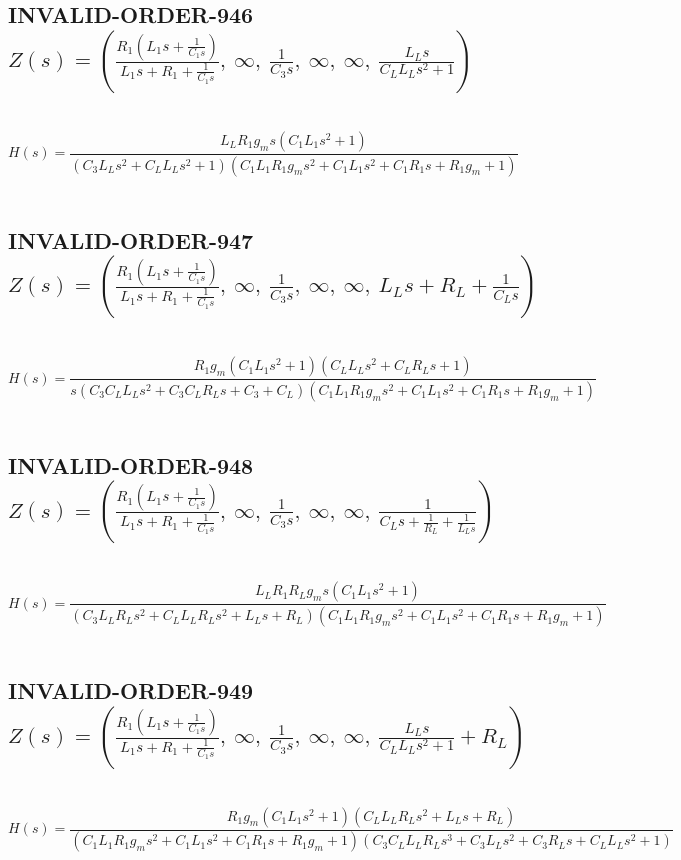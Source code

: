 \documentclass{article}
\begin{document}
\subsection{INVALID-ORDER-946 $Z(s) = \left( \frac{R_{1} \left(L_{1} s + \frac{1}{C_{1} s}\right)}{L_{1} s + R_{1} + \frac{1}{C_{1} s}}, \  \infty, \  \frac{1}{C_{3} s}, \  \infty, \  \infty, \  \frac{L_{L} s}{C_{L} L_{L} s^{2} + 1}\right)$ } \ 
\textbf{\[H(s) = \frac{L_{L} R_{1} g_{m} s \left(C_{1} L_{1} s^{2} + 1\right)}{\left(C_{3} L_{L} s^{2} + C_{L} L_{L} s^{2} + 1\right) \left(C_{1} L_{1} R_{1} g_{m} s^{2} + C_{1} L_{1} s^{2} + C_{1} R_{1} s + R_{1} g_{m} + 1\right)}\] } \ 
\subsection{INVALID-ORDER-947 $Z(s) = \left( \frac{R_{1} \left(L_{1} s + \frac{1}{C_{1} s}\right)}{L_{1} s + R_{1} + \frac{1}{C_{1} s}}, \  \infty, \  \frac{1}{C_{3} s}, \  \infty, \  \infty, \  L_{L} s + R_{L} + \frac{1}{C_{L} s}\right)$ } \ 
\textbf{\[H(s) = \frac{R_{1} g_{m} \left(C_{1} L_{1} s^{2} + 1\right) \left(C_{L} L_{L} s^{2} + C_{L} R_{L} s + 1\right)}{s \left(C_{3} C_{L} L_{L} s^{2} + C_{3} C_{L} R_{L} s + C_{3} + C_{L}\right) \left(C_{1} L_{1} R_{1} g_{m} s^{2} + C_{1} L_{1} s^{2} + C_{1} R_{1} s + R_{1} g_{m} + 1\right)}\] } \ 
\subsection{INVALID-ORDER-948 $Z(s) = \left( \frac{R_{1} \left(L_{1} s + \frac{1}{C_{1} s}\right)}{L_{1} s + R_{1} + \frac{1}{C_{1} s}}, \  \infty, \  \frac{1}{C_{3} s}, \  \infty, \  \infty, \  \frac{1}{C_{L} s + \frac{1}{R_{L}} + \frac{1}{L_{L} s}}\right)$ } \ 
\textbf{\[H(s) = \frac{L_{L} R_{1} R_{L} g_{m} s \left(C_{1} L_{1} s^{2} + 1\right)}{\left(C_{3} L_{L} R_{L} s^{2} + C_{L} L_{L} R_{L} s^{2} + L_{L} s + R_{L}\right) \left(C_{1} L_{1} R_{1} g_{m} s^{2} + C_{1} L_{1} s^{2} + C_{1} R_{1} s + R_{1} g_{m} + 1\right)}\] } \ 
\subsection{INVALID-ORDER-949 $Z(s) = \left( \frac{R_{1} \left(L_{1} s + \frac{1}{C_{1} s}\right)}{L_{1} s + R_{1} + \frac{1}{C_{1} s}}, \  \infty, \  \frac{1}{C_{3} s}, \  \infty, \  \infty, \  \frac{L_{L} s}{C_{L} L_{L} s^{2} + 1} + R_{L}\right)$ } \ 
\textbf{\[H(s) = \frac{R_{1} g_{m} \left(C_{1} L_{1} s^{2} + 1\right) \left(C_{L} L_{L} R_{L} s^{2} + L_{L} s + R_{L}\right)}{\left(C_{1} L_{1} R_{1} g_{m} s^{2} + C_{1} L_{1} s^{2} + C_{1} R_{1} s + R_{1} g_{m} + 1\right) \left(C_{3} C_{L} L_{L} R_{L} s^{3} + C_{3} L_{L} s^{2} + C_{3} R_{L} s + C_{L} L_{L} s^{2} + 1\right)}\] } \ 
\end{document}
